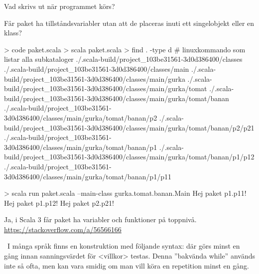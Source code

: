 \Subtask Vad skrivs ut när programmet körs?

\Subtask Får paket ha tillståndsvariabler utan att de placeras inuti ett singelobjekt eller en klass?

\SOLUTION

\TaskSolved \what

\SubtaskSolved

\begin{REPL}
> code paket.scala
> scala paket.scala
> find . -type d         # linuxkommando som listar alla subkataloger
./.scala-build/project_103be31561-3d0d386400/classes
./.scala-build/project_103be31561-3d0d386400/classes/main
./.scala-build/project_103be31561-3d0d386400/classes/main/gurka
./.scala-build/project_103be31561-3d0d386400/classes/main/gurka/tomat
./.scala-build/project_103be31561-3d0d386400/classes/main/gurka/tomat/banan
./.scala-build/project_103be31561-3d0d386400/classes/main/gurka/tomat/banan/p2
./.scala-build/project_103be31561-3d0d386400/classes/main/gurka/tomat/banan/p2/p21
./.scala-build/project_103be31561-3d0d386400/classes/main/gurka/tomat/banan/p1
./.scala-build/project_103be31561-3d0d386400/classes/main/gurka/tomat/banan/p1/p12
./.scala-build/project_103be31561-3d0d386400/classes/main/gurka/tomat/banan/p1/p11
\end{REPL}

\SubtaskSolved
\begin{REPL}
> scala run paket.scala --main-class gurka.tomat.banan.Main
Hej paket p1.p11!
Hej paket p1.p12!
Hej paket p2.p21!
\end{REPL}

\SubtaskSolved Ja, i Scala 3 får paket ha variabler och funktioner på toppnivå. \\
 \url{https://stackoverflow.com/a/56566166}

\QUESTEND





\AdvancedTasks %









\QUESTBEGIN

\Task  \what~I många språk finns en konstruktion med följande syntax:  där  görs minst en gång innan sanningsvärdet för <villkor> testas. Denna ''bakvända while'' används inte så ofta, men kan vara smidig om man vill köra en repetition minst en gång. 

